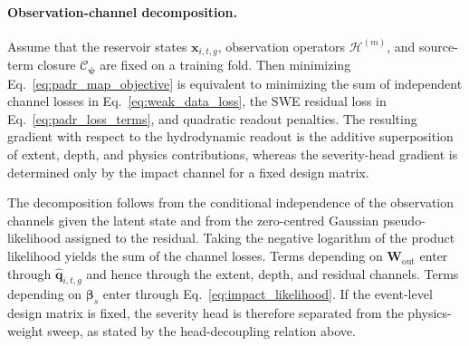 \documentclass[pdflatex,sn-mathphys-ay]{sn-jnl}
\theoremstyle{thmstyleone}
\begin{document}
\paragraph{Observation-channel decomposition.}
Assume that the reservoir states $\mathbf{x}_{i,t,g}$, observation
operators $\mathcal{H}^{(m)}$, and source-term closure
$\mathcal{C}_{\boldsymbol{\psi}}$ are fixed on a training fold.  Then
minimizing Eq.~\eqref{eq:padr_map_objective} is equivalent to
minimizing the sum of independent channel losses in
Eq.~\eqref{eq:weak_data_loss}, the SWE residual loss in
Eq.~\eqref{eq:padr_loss_terms}, and quadratic readout penalties.  The
resulting gradient with respect to the hydrodynamic readout is the
additive superposition of extent, depth, and physics contributions,
whereas the severity-head gradient is determined only by the impact
channel for a fixed design matrix.


The decomposition follows from the conditional independence of the
observation channels given the latent state and from the zero-centred
Gaussian pseudo-likelihood assigned to the residual.  Taking the
negative logarithm of the product likelihood yields the sum of the
channel losses.  Terms depending on $\mathbf{W}_{\mathrm{out}}$ enter
through $\hat{\mathbf{q}}_{i,t,g}$ and hence through the extent, depth,
and residual channels.  Terms depending on $\boldsymbol{\beta}_{s}$
enter through Eq.~\eqref{eq:impact_likelihood}.  If the event-level
design matrix is fixed, the severity head is therefore separated from
the physics-weight sweep, as stated by the head-decoupling relation above.
\end{document}
